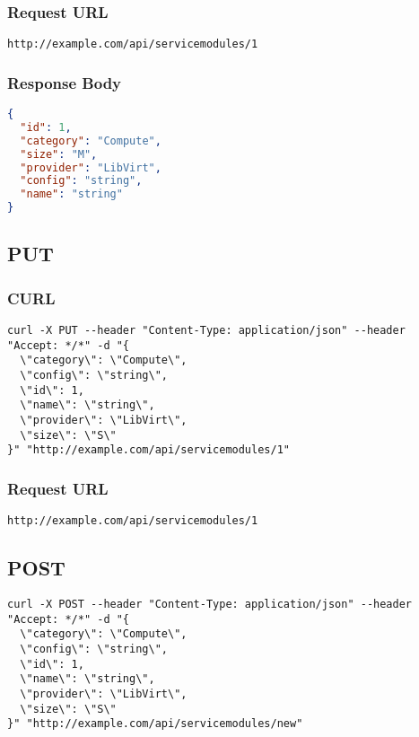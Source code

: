 \subsubsection{Request URL}
\begin{lstlisting}[] 
http://example.com/api/servicemodules/1
\end{lstlisting}


\subsubsection{Response Body}
\begin{lstlisting}[language=json] 
{
  "id": 1,
  "category": "Compute",
  "size": "M",
  "provider": "LibVirt",
  "config": "string",
  "name": "string"
}
\end{lstlisting}


\subsection{PUT}
\subsubsection{CURL}
\begin{lstlisting}[] 
curl -X PUT --header "Content-Type: application/json" --header "Accept: */*" -d "{
  \"category\": \"Compute\",
  \"config\": \"string\",
  \"id\": 1,
  \"name\": \"string\",
  \"provider\": \"LibVirt\",
  \"size\": \"S\"
}" "http://example.com/api/servicemodules/1"
\end{lstlisting}


\subsubsection{Request URL}
\begin{lstlisting}[] 
http://example.com/api/servicemodules/1
\end{lstlisting}

\subsection{POST}
\begin{lstlisting}[] 
curl -X POST --header "Content-Type: application/json" --header "Accept: */*" -d "{
  \"category\": \"Compute\",
  \"config\": \"string\",
  \"id\": 1,
  \"name\": \"string\",
  \"provider\": \"LibVirt\",
  \"size\": \"S\"
}" "http://example.com/api/servicemodules/new"
\end{lstlisting}


